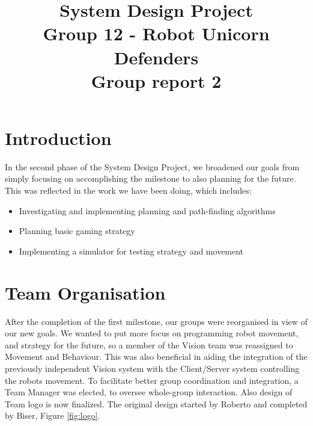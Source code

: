\documentclass[conference,12pt]{IEEEtran}
\begin{document}
	
\title{System Design Project
	\\Group 12 - Robot Unicorn Defenders
	\\Group report 2}

\author{
}
	
\maketitle
{}
\IEEEpeerreviewmaketitle

\pagebreak
	
\section{Introduction}
\vspace{-2 mm}
In the second phase of the System Design Project, we broadened our goals from simply focusing on accomplishing the milestone to also planning for the future. This was reflected in the work we have been doing, which includes:
\begin{itemize}
\item Investigating and implementing planning and path-finding algorithms  
\item Planning basic gaming strategy
\item Implementing a simulator for testing strategy and movement
\end{itemize}
\vspace{-2 mm}
\section{Team Organisation}
\vspace{-2 mm}
After the completion of the first milestone, our groups were reorganised in view of our new goals. We wanted to put more focus on programming robot movement, and strategy for the future, so a member of the Vision team was reassigned to Movement and Behaviour. This was also beneficial in aiding the integration of the previously independent Vision system with the Client/Server system controlling the robots movement. To facilitate better group coordination and integration, a Team Manager was elected, to oversee whole-group interaction. Also design of Team logo is now finalized. The original design started by Roberto and completed by Biser, Figure \ref{fig:logo}.
\vspace{-2 mm}
\end{document}

